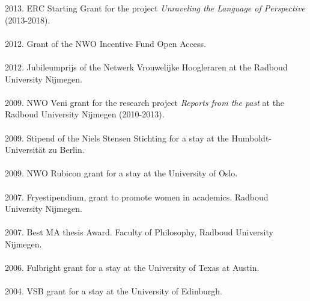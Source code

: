 \documentclass[a4paper,11pt]{article}
\begin{document}
2013. ERC Starting Grant for the project \emph{Unraveling the Language of Perspective} (2013-2018).\\\\
2012. Grant of the NWO Incentive Fund Open Access.\\\\
2012. Jubileumprijs of the Netwerk Vrouwelijke Hoogleraren at the Radboud University Nijmegen.\\\\
2009.  NWO Veni grant for the research project \emph{Reports from the past} at the Radboud University Nijmegen (2010-2013).\\\\
2009.  Stipend of the Niels Stensen Stichting for a stay at the Humboldt-Universit\"at zu Berlin.\\\\
2009. NWO Rubicon grant for a stay at the University of Oslo.\\\\
2007. Fryestipendium, grant to promote women in academics. Radboud University Nijmegen.\\\\ 
2007. Best MA thesis Award. Faculty of Philosophy, Radboud University Nijmegen.\\\\  
2006. Fulbright grant for a stay at the University of Texas at Austin.\\\\ 
2004. VSB grant for a stay at the University of
Edinburgh.\\
\end{document}
